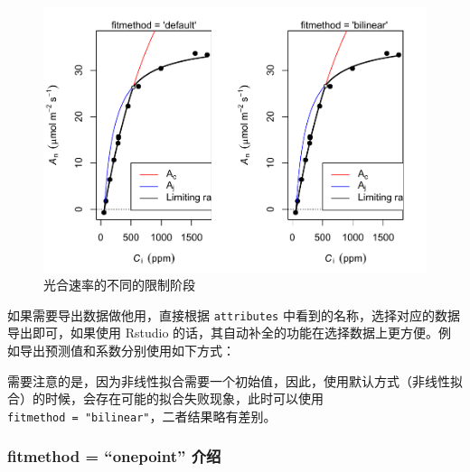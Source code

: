 \documentclass[
]{krantz}
\makeatletter
\newenvironment{Shaded}{\begin{snugshade}}{\end{snugshade}}
\newcommand{\AttributeTok}[1]{\textcolor[rgb]{0.77,0.63,0.00}{#1}}
\newcommand{\CommentTok}[1]{\textcolor[rgb]{0.56,0.35,0.01}{\textit{#1}}}
\newcommand{\FunctionTok}[1]{\textcolor[rgb]{0.00,0.00,0.00}{#1}}
\newcommand{\NormalTok}[1]{#1}
\newcommand{\OtherTok}[1]{\textcolor[rgb]{0.56,0.35,0.01}{#1}}
\newcommand{\SpecialCharTok}[1]{\textcolor[rgb]{0.00,0.00,0.00}{#1}}
\newcommand{\StringTok}[1]{\textcolor[rgb]{0.31,0.60,0.02}{#1}}
\renewenvironment{quote}{\begin{VF}}{\end{VF}}
\newenvironment{kframe}{%
\medskip{}
\setlength{\fboxsep}{.8em}
 \def\at@end@of@kframe{}%
 \ifinner\ifhmode%
  \def\at@end@of@kframe{\end{minipage}}%
  \begin{minipage}{\columnwidth}%
 \fi\fi%
 \def\FrameCommand##1{\hskip\@totalleftmargin \hskip-\fboxsep
 \colorbox{shadecolor}{##1}\hskip-\fboxsep
     \hskip-\linewidth \hskip-\@totalleftmargin \hskip\columnwidth}%
 \MakeFramed {\advance\hsize-\width
   \@totalleftmargin\z@ \linewidth\hsize
   \@setminipage}}%
 {\par\unskip\endMakeFramed%
 \at@end@of@kframe}
\renewenvironment{Shaded}{\begin{kframe}}{\end{kframe}}
\makeatother
\begin{document}
\begin{figure}
\centering
\includegraphics{bookdown_files/figure-latex/fitaci6400-1.pdf}
\caption{\label{fig:fitaci6400}光合速率的不同的限制阶段}
\end{figure}

如果需要导出数据做他用，直接根据 \texttt{attributes} 中看到的名称，选择对应的数据导出即可，如果使用 Rstudio 的话，其自动补全的功能在选择数据上更方便。例如导出预测值和系数分别使用如下方式：

\begin{Shaded}
\end{Shaded}

\begin{quote}
需要注意的是，因为非线性拟合需要一个初始值，因此，使用默认方式（非线性拟合）的时候，会存在可能的拟合失败现象，此时可以使用 \texttt{fitmethod\ =\ "bilinear"}，二者结果略有差别。
\end{quote}

\hypertarget{onepoint}{%
\subsubsection{fitmethod = ``onepoint'' 介绍}\label{onepoint}}
\end{document}
